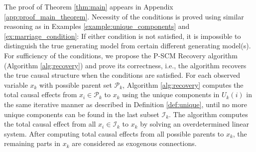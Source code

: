 \documentclass[12pt]{article}
\newcommand{\bW}{\mathbf{W}}
\begin{document}
\vspace{-1mm}

The proof of Theorem \ref{thm:main} appears in Appendix \ref{app:proof_main_theorem}. Necessity of the conditions is proved using similar reasoning as in Examples \ref{example:unique_components} and \ref{ex:marriage_condition}: If either condition is not satisfied, it is impossible to distinguish the true generating model from certain different generating model(s).
For sufficiency of the conditions, we propose the P-SCM Recovery algorithm (Algorithm \ref{alg:recovery}) and prove its correctness, i.e., the algorithm recovers the true causal structure when the conditions are satisfied. For each observed variable $x_k$ with possible parent set $\mathcal{P}_k$, Algorithm \ref{alg:recovery} computes the total causal effects from $x_i\in \mathcal{P}_k$ to $x_k$ using the unique components in $U_k(i)$ in the same iterative manner as described in Definition \ref{def:unique}, until no more unique components can be found in the last subset $\mathcal{I}_k$. The algorithm computes the total causal effect from all $x_i\in \mathcal{I}_k$ to $x_k$ by solving an overdetermined linear system. 
After computing total causal effects from all possible parents to $x_k$, the remaining parts in $x_k$ are considered as exogenous connections.



\vspace{-3mm}
\end{document}
